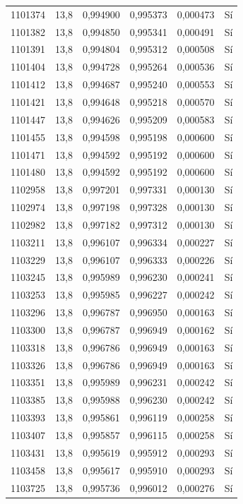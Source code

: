 \begin{longtable}{lccccc}
1101374 & 13,8 & 0,994900 & 0,995373 & 0,000473 & Sí \\
1101382 & 13,8 & 0,994850 & 0,995341 & 0,000491 & Sí \\
1101391 & 13,8 & 0,994804 & 0,995312 & 0,000508 & Sí \\
1101404 & 13,8 & 0,994728 & 0,995264 & 0,000536 & Sí \\
1101412 & 13,8 & 0,994687 & 0,995240 & 0,000553 & Sí \\
1101421 & 13,8 & 0,994648 & 0,995218 & 0,000570 & Sí \\
1101447 & 13,8 & 0,994626 & 0,995209 & 0,000583 & Sí \\
1101455 & 13,8 & 0,994598 & 0,995198 & 0,000600 & Sí \\
1101471 & 13,8 & 0,994592 & 0,995192 & 0,000600 & Sí \\
1101480 & 13,8 & 0,994592 & 0,995192 & 0,000600 & Sí \\
1102958 & 13,8 & 0,997201 & 0,997331 & 0,000130 & Sí \\
1102974 & 13,8 & 0,997198 & 0,997328 & 0,000130 & Sí \\
1102982 & 13,8 & 0,997182 & 0,997312 & 0,000130 & Sí \\
1103211 & 13,8 & 0,996107 & 0,996334 & 0,000227 & Sí \\
1103229 & 13,8 & 0,996107 & 0,996333 & 0,000226 & Sí \\
1103245 & 13,8 & 0,995989 & 0,996230 & 0,000241 & Sí \\
1103253 & 13,8 & 0,995985 & 0,996227 & 0,000242 & Sí \\
1103296 & 13,8 & 0,996787 & 0,996950 & 0,000163 & Sí \\
1103300 & 13,8 & 0,996787 & 0,996949 & 0,000162 & Sí \\
1103318 & 13,8 & 0,996786 & 0,996949 & 0,000163 & Sí \\
1103326 & 13,8 & 0,996786 & 0,996949 & 0,000163 & Sí \\
1103351 & 13,8 & 0,995989 & 0,996231 & 0,000242 & Sí \\
1103385 & 13,8 & 0,995988 & 0,996230 & 0,000242 & Sí \\
1103393 & 13,8 & 0,995861 & 0,996119 & 0,000258 & Sí \\
1103407 & 13,8 & 0,995857 & 0,996115 & 0,000258 & Sí \\
1103431 & 13,8 & 0,995619 & 0,995912 & 0,000293 & Sí \\
1103458 & 13,8 & 0,995617 & 0,995910 & 0,000293 & Sí \\
1103725 & 13,8 & 0,995736 & 0,996012 & 0,000276 & Sí \\

\end{longtable}
